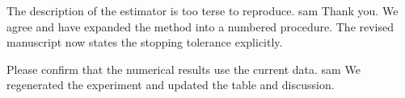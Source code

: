 %
%
%

\responseheading

  {The description of the estimator is too terse to reproduce.}
  {sam}
  {Thank you. We agree and have expanded the method into a numbered procedure.}
  {The revised manuscript now states the stopping tolerance explicitly.}

  {Please confirm that the numerical results use the current data.}
  {sam}
  {We regenerated the experiment and updated the table and discussion.}

